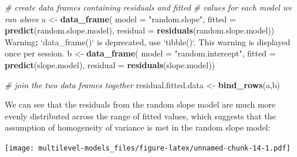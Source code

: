 \documentclass[]{article}
\newenvironment{Shaded}{\begin{snugshade}}{\end{snugshade}}
\newcommand{\CommentTok}[1]{\textcolor[rgb]{0.56,0.35,0.01}{\textit{#1}}}
\newcommand{\DataTypeTok}[1]{\textcolor[rgb]{0.13,0.29,0.53}{#1}}
\newcommand{\KeywordTok}[1]{\textcolor[rgb]{0.13,0.29,0.53}{\textbf{#1}}}
\newcommand{\NormalTok}[1]{#1}
\newcommand{\OperatorTok}[1]{\textcolor[rgb]{0.81,0.36,0.00}{\textbf{#1}}}
\newcommand{\StringTok}[1]{\textcolor[rgb]{0.31,0.60,0.02}{#1}}
\begin{document}
\begin{Shaded}
\begin{Highlighting}[]
\CommentTok{# create data frames containing residuals and fitted}
\CommentTok{# values for each model we ran above}
\NormalTok{a <-}\StringTok{  }\KeywordTok{data_frame}\NormalTok{(}
    \DataTypeTok{model =} \StringTok{"random.slope"}\NormalTok{,}
    \DataTypeTok{fitted =} \KeywordTok{predict}\NormalTok{(random.slope.model),}
    \DataTypeTok{residual =} \KeywordTok{residuals}\NormalTok{(random.slope.model))}
\NormalTok{Warning}\OperatorTok{:}\StringTok{ `}\DataTypeTok{data_frame()}\StringTok{`}\NormalTok{ is deprecated, use }\StringTok{`}\DataTypeTok{tibble()}\StringTok{`}\NormalTok{.}
\NormalTok{This warning is displayed once per session.}
\NormalTok{b <-}\StringTok{ }\KeywordTok{data_frame}\NormalTok{(}
    \DataTypeTok{model =} \StringTok{"random.intercept"}\NormalTok{,}
    \DataTypeTok{fitted =} \KeywordTok{predict}\NormalTok{(slope.model),}
    \DataTypeTok{residual =} \KeywordTok{residuals}\NormalTok{(slope.model))}

\CommentTok{# join the two data frames together}
\NormalTok{residual.fitted.data <-}\StringTok{ }\KeywordTok{bind_rows}\NormalTok{(a,b)}
\end{Highlighting}
\end{Shaded}

We can see that the residuals from the random slope model are much more evenly
distributed across the range of fitted values, which suggests that the
assumption of homogeneity of variance is met in the random slope model:

\begin{Shaded}
\end{Shaded}

\texttt{[image: multilevel-models\_files/figure-latex/unnamed-chunk-14-1.pdf]}
\end{document}
